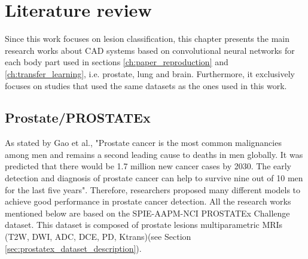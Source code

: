 
\chapter{Literature review}
\label{ch:literature_review}
\setlength{\marginparwidth}{3cm}\leavevmode {}Since this work focuses on lesion classification, this chapter presents the main research works about CAD systems based on convolutional neural networks for each body part used in sections \ref{ch:paper_reproduction} and \ref{ch:transfer_learning}, i.e. prostate, lung and brain. Furthermore, it exclusively focuses on studies that used the same datasets as the ones used in this work.

\section{Prostate/PROSTATEx}

\setlength{\marginparwidth}{3cm}\leavevmode {}As stated by Gao et al., "Prostate  cancer  is  the  most  common  malignancies  among  men  and  remains  a  second  leading  cause to deaths in men globally. It was predicted that there would be 1.7 million new cancer cases by 2030. The early detection and diagnosis of prostate cancer can help to survive nine out of 10 men for the last five years"\cite{41}. Therefore, researchers proposed many different models to achieve good performance in prostate cancer detection. All the research works mentioned below are based on the SPIE-AAPM-NCI PROSTATEx Challenge dataset. This dataset is composed of prostate lesions multiparametric MRIs (T2W, DWI, ADC, DCE, PD, Ktrans)(see Section \ref{sec:prostatex_dataset_description}).

